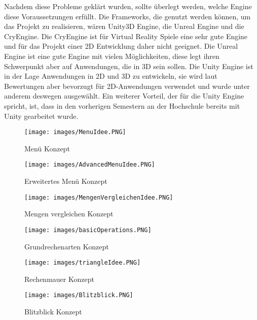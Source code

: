 Nachdem diese Probleme geklärt wurden, sollte überlegt werden, welche Engine diese Voraussetzungen erfüllt. Die Frameworks, die genutzt werden können, um das Projekt zu realisieren, wären Unity3D Engine, die Unreal Engine und die CryEngine. Die CryEngine ist für Virtual Reality Spiele eine sehr gute Engine und für das Projekt einer 2D Entwicklung daher nicht geeignet. Die Unreal Engine ist eine gute Engine mit vielen Möglichkeiten, diese legt ihren Schwerpunkt aber auf Anwendungen, die in 3D sein sollen. Die Unity Engine ist in der Lage Anwendungen in 2D und 3D zu entwickeln, sie wird laut Bewertungen aber bevorzugt für 2D-Anwendungen verwendet und wurde unter anderem deswegen ausgewählt. Ein weiterer Vorteil, der für die Unity Engine spricht, ist, dass in den vorherigen Semestern an der Hochschule bereits mit Unity gearbeitet wurde.


\begin{figure}[htbp]
  \centering
  \texttt{[image: images/MenuIdee.PNG]}
  \caption{Menü Konzept}
  \label{MenuIdee}
\end{figure}

\begin{figure}[htbp]
  \centering
  \texttt{[image: images/AdvancedMenuIdee.PNG]}
  \caption{Erweitertes Menü Konzept}
  \label{MenuErweitertIdee}
\end{figure}

\begin{figure}[htbp]
  \centering
  \texttt{[image: images/MengenVergleichenIdee.PNG]}
  \caption{Mengen vergleichen Konzept}
  \label{MengenKonzept}
\end{figure}

\begin{figure}[htbp]
  \centering
  \texttt{[image: images/basicOperations.PNG]}
  \caption{Grundrechenarten Konzept}
  \label{GrundrechenartenKonzept}
\end{figure}

\begin{figure}[htbp]
  \centering
  \texttt{[image: images/triangleIdee.PNG]}
  \caption{Rechenmauer Konzept}
  \label{RechenmauerKonzept}
\end{figure}

\begin{figure}[htbp]
  \centering
  \texttt{[image: images/Blitzblick.PNG]}
  \caption{Blitzblick Konzept}
  \label{BlitzblickKonzept}
\end{figure}

